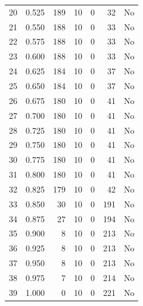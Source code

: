\documentclass[a4paper,twoside,12pt]{book}
\begin{document}
\begin{appendices}
\begin{table}
\begin{tabular}{lrrrrrl}
		20 &  0.525 &       189 &        10 &               0 &              32 &     No \\
		21 &  0.550 &       188 &        10 &               0 &              33 &     No \\
		22 &  0.575 &       188 &        10 &               0 &              33 &     No \\
		23 &  0.600 &       188 &        10 &               0 &              33 &     No \\
		24 &  0.625 &       184 &        10 &               0 &              37 &     No \\
		25 &  0.650 &       184 &        10 &               0 &              37 &     No \\
		26 &  0.675 &       180 &        10 &               0 &              41 &     No \\
		27 &  0.700 &       180 &        10 &               0 &              41 &     No \\
		28 &  0.725 &       180 &        10 &               0 &              41 &     No \\
		29 &  0.750 &       180 &        10 &               0 &              41 &     No \\
		30 &  0.775 &       180 &        10 &               0 &              41 &     No \\
		31 &  0.800 &       180 &        10 &               0 &              41 &     No \\
		32 &  0.825 &       179 &        10 &               0 &              42 &     No \\
		33 &  0.850 &        30 &        10 &               0 &             191 &     No \\
		34 &  0.875 &        27 &        10 &               0 &             194 &     No \\
		35 &  0.900 &         8 &        10 &               0 &             213 &     No \\
		36 &  0.925 &         8 &        10 &               0 &             213 &     No \\
		37 &  0.950 &         8 &        10 &               0 &             213 &     No \\
		38 &  0.975 &         7 &        10 &               0 &             214 &     No \\
		39 &  1.000 &         0 &        10 &               0 &             221 &     No \\
		\bottomrule
		\end{tabular}		
\end{table} 


\end{appendices}
\end{document}
